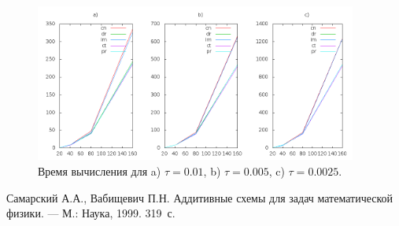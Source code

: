 \documentclass[12pt]{article}
\begin{document}
\begin{figure}
	\begin{center}
		\includegraphics[width=400px]{data160/scheme-time}
		\caption{Время вычисления для a) $\tau=0.01$, b) $\tau=0.005$, c) $\tau=0.0025$.}
		\label{fg:scheme-time}
	\end{center}
\end{figure}

\begin{thebibliography}{9}
 Самарский А.А., Вабищевич П.Н. Аддитивные схемы для задач математической физики. \newblock --- М.: Наука, 1999. 319~с.
\end{thebibliography}
\end{document}
